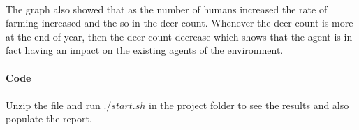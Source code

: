 \documentclass[notitlepage]{report}
\begin{document}
	\paragraph{} The graph also showed that as the number of humans increased the rate of farming increased and the so in the deer count. Whenever the deer count is more at the end of year, then the deer count decrease which shows that the agent is in fact having an impact on the existing agents of the environment.
	
	\paragraph{Code}
	\paragraph{} Unzip the file and run $./start.sh$ in the project folder to see the results and also populate the report.
\end{document}
